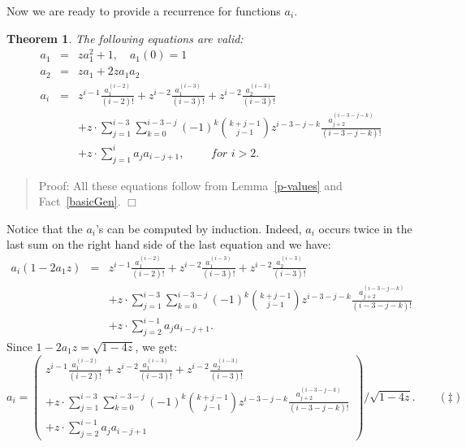 \documentclass{jfp1}
\newenvironment{proof}[1]{\begin{quotation}\noindent\textsf{Proof:} #1}
{\(\Box\)\end{quotation}}
\newtheorem{theo}{Theorem}
\begin{document}
Now we are ready to provide a recurrence for functions $a_i$.

\begin{theo}\label{functionsRel}
The following equations are valid:
\begin{eqnarray*}
 a_1 &=& za_1^2 + 1, \quad a_1(0)=1\\
 a_2 &=& za_1 + 2za_1a_2\\
 a_i &=& z^{i-1}\frac{a_1^{(i-2)}}{(i-2)!} + z^{i-2}\frac{a_1^{(i-3)}}{(i-3)!} + z^{i-2}\frac{a_2^{(i-3)}}{(i-3)!} \\
      &&+ z \cdot \sum_{j=1}^{i-3} \sum_{k=0}^{i-3-j} (-1)^k {k+j-1 \choose j-1} z^{i-3-j-k} \frac{a_{j + 2}^{(i-3-j-k)}}{(i-3-j-k)!} \\
      &&+ z \cdot \sum_{j=1}^{i} a_j a_{i-j+1}, \qquad \textit{~for~}  i > 2.
 \end{eqnarray*}
\end{theo}



\begin{proof}
All these equations follow from Lemma~\ref{p-values} and Fact~\ref{basicGen}.
\end{proof}

Notice that the $a_i$'s can be computed by induction. Indeed, $a_i$ occurs twice in
the last sum on the right hand side of the last equation and we have:
\begin{eqnarray*}
  a_i (1-2a_1z) &=& z^{i-1}\frac{a_1^{(i-2)}}{(i-2)!} + z^{i-2}\frac{a_1^{(i-3)}}{(i-3)!} + z^{i-2}\frac{a_2^{(i-3)}}{(i-3)!} \\
      &&+ z \cdot \sum_{j=1}^{i-3} \sum_{k=0}^{i-3-j} (-1)^k {k+j-1 \choose j-1} z^{i-3-j-k} \frac{a_{j + 2}^{(i-3-j-k)}}{(i-3-j-k)!} \\
      &&+ z \cdot \sum_{j=2}^{i-1} a_j a_{i-j+1}.
\end{eqnarray*}
Since $1-2a_1 z= \sqrt{1-4z}$, we get:
\begin{displaymath}
a_i = \left(
  \begin{array}{l}
    z^{i-1}\frac{a_1^{(i-2)}}{(i-2)!} + z^{i-2}\frac{a_1^{(i-3)}}{(i-3)!} + z^{i-2}\frac{a_2^{(i-3)}}{(i-3)!} \\
      + z \cdot \sum_{j=1}^{i-3} \sum_{k=0}^{i-3-j} (-1)^k {k+j-1 \choose j-1} z^{i-3-j-k} \frac{a_{j + 2}^{(i-3-j-k)}}{(i-3-j-k)!} \\
      + z \cdot \sum_{j=2}^{i-1} a_j a_{i-j+1}
    \end{array}
  \right) / \sqrt{1-4z}. \qquad (\ddagger)
    \end{displaymath}
\end{document}
